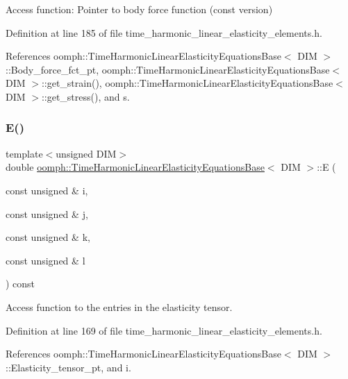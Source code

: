 Access function\+: Pointer to body force function (const version) 



Definition at line 185 of file time\+\_\+harmonic\+\_\+linear\+\_\+elasticity\+\_\+elements.\+h.



References oomph\+::\+Time\+Harmonic\+Linear\+Elasticity\+Equations\+Base$<$ D\+I\+M $>$\+::\+Body\+\_\+force\+\_\+fct\+\_\+pt, oomph\+::\+Time\+Harmonic\+Linear\+Elasticity\+Equations\+Base$<$ D\+I\+M $>$\+::get\+\_\+strain(), oomph\+::\+Time\+Harmonic\+Linear\+Elasticity\+Equations\+Base$<$ D\+I\+M $>$\+::get\+\_\+stress(), and s.

\mbox{\label{classoomph_1_1TimeHarmonicLinearElasticityEquationsBase_abb02bc2bde900a4f4b447dc4f3878caa}} 
\subsubsection{\texorpdfstring{E()}{E()}}
{\footnotesize\ttfamily template$<$unsigned D\+IM$>$ \\
double \hyperlink{classoomph_1_1TimeHarmonicLinearElasticityEquationsBase}{oomph\+::\+Time\+Harmonic\+Linear\+Elasticity\+Equations\+Base}$<$ D\+IM $>$\+::E (\begin{DoxyParamCaption}\item[{const unsigned \&}]{i,  }\item[{const unsigned \&}]{j,  }\item[{const unsigned \&}]{k,  }\item[{const unsigned \&}]{l }\end{DoxyParamCaption}) const\hspace{0.3cm}{\ttfamily [inline]}}



Access function to the entries in the elasticity tensor. 



Definition at line 169 of file time\+\_\+harmonic\+\_\+linear\+\_\+elasticity\+\_\+elements.\+h.



References oomph\+::\+Time\+Harmonic\+Linear\+Elasticity\+Equations\+Base$<$ D\+I\+M $>$\+::\+Elasticity\+\_\+tensor\+\_\+pt, and i.

